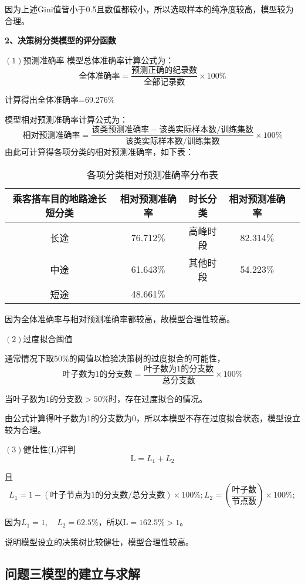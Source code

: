 \documentclass[withoutpreface,bwprint]{cumcmthesis} %
\begin{document}
因为上述Gini值皆小于0.5且数值都较小，所以选取样本的纯净度较高，模型较为合理。

\textbf{2、决策树分类模型的评分函数}

$(1)$预测准确率
模型总体准确率计算公式为：
$$
\text{全体准确率}=\frac{\text{预测正确的纪录数}}{\text{全部记录数}} \times 100 \%
$$

计算得出全体准确率=69.276$\%$

模型相对预测准确率计算公式为：
$$
\text{相对预测准确率}=\frac{{\text{该类预测准确率}}-{\text{该类实际样本数}}/{\text{训练集数}}}{{\text{该类实际样本数}}/{\text{训练集数}}} \times 100 \%
$$
由此可计算得各项分类的相对预测准确率，如下表：
\begin{table}[!h]
	\caption{各项分类相对预测准确率分布表}\label{tab:007} \centering
	\begin{tabular}{ccccc}
		\toprule[2pt]
		乘客搭车目的地路途长短分类& 相对预测准确率 & 时长分类 & 相对预测准确率\\
		\midrule[1pt]
		长途 & 76.712$\%$ & 高峰时段 & 82.314$\%$\\
		中途 & 61.643$\%$ & 其他时段 & 54.223$\%$\\
		短途 & 48.661$\%$\\
		\bottomrule[1.5pt]
	\end{tabular}
\end{table}

因为全体准确率与相对预测准确率都较高，故模型合理性较高。

$(2)$过度拟合阈值

通常情况下取50$\%$的阈值以检验决策树的过度拟合的可能性，
$$
\text{叶子数为1的分支数}=\frac{\text{叶子数为1的分支数}}{\text{总分支数}} \times 100 \%
$$

当叶子数为1的分支数$>50$$\%$时，存在过度拟合的情况。

由公式计算得叶子数为1的分支数为0，所以本模型不存在过度拟合状态，模型设立较为合理。

$(3)$健壮性(L)评判
$$
\mathrm{L}=L_{1}+L_{2}
$$

且
$$
L_{1}=1-({\text{叶子节点为1的分支数}} / {\text{总分支数}}) \times 100 \% ; 
L_{2}=\left(\frac{{\text{叶子数}}}{{\text{节点数}}}\right) \times 100 \%;
$$

因为$L_{1}=1, \quad L_{2}=62.5 \%$，所以$\mathrm{L}=162.5 \%>1$。

说明模型设立的决策树比较健壮，模型合理性较高。
\newpage
\subsection{问题三模型的建立与求解}
\end{document}
